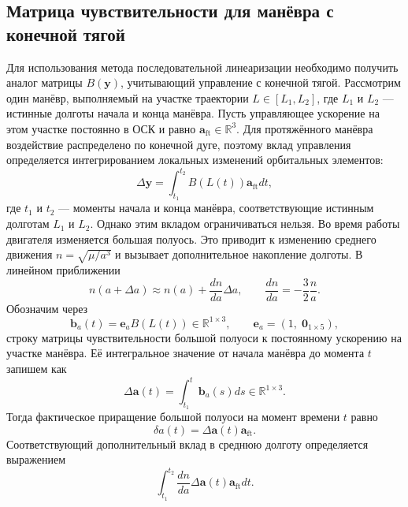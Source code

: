 \subsection{Матрица чувствительности для манёвра с конечной тягой}

Для использования метода последовательной линеаризации необходимо получить аналог матрицы $B(\mathbf{y})$, учитывающий управление с конечной тягой. Рассмотрим один манёвр, выполняемый на участке траектории $L \in [L_1, L_2]$, где $L_1$ и $L_2$ --- истинные долготы начала и конца манёвра. Пусть управляющее ускорение на этом участке постоянно в ОСК и равно $\mathbf{a}_{\text{ft}} \in \mathbb{R}^{3}$. Для протяжённого манёвра воздействие распределено по конечной дуге, поэтому вклад управления определяется интегрированием локальных изменений орбитальных элементов:
\begin{equation}
    \Delta \mathbf{y} = \int_{t_1}^{t_2} B(L(t)) \mathbf{a}_{\text{ft}} dt,
\end{equation}
где $t_1$ и $t_2$ --- моменты начала и конца манёвра, соответствующие истинным долготам $L_1$ и $L_2$.
Однако этим вкладом ограничиваться нельзя. Во время работы двигателя изменяется большая полуось. Это приводит к изменению среднего движения $n = \sqrt{\mu / a^3}$ и вызывает дополнительное накопление долготы. В линейном приближении
\begin{equation}
    n(a + \Delta a) \approx n(a) + \frac{dn}{da} \Delta a, \quad \quad 
    \frac{dn}{da} = -\frac{3}{2} \frac{n}{a}.
\end{equation}
Обозначим через
\begin{equation}
    \mathbf{b}_a(t) = \mathbf{e}_a B(L(t)) \in \mathbb{R}^{1 \times 3}, \quad \quad
    \mathbf{e}_a = \left( 1, \; \mathbf{0}_{1 \times 5} \right),
\end{equation}
строку матрицы чувствительности большой полуоси к постоянному ускорению на участке манёвра. Её интегральное значение от начала манёвра до момента $t$ запишем как
\begin{equation}
    \Delta \mathbf{a}(t) = \int_{t_1}^t \mathbf{b}_a(s) ds \in \mathbb{R}^{1 \times 3}.
\label{da_b_a}
\end{equation}
Тогда фактическое приращение большой полуоси на момент времени $t$ равно
\begin{equation}
    \delta a(t) = \Delta \mathbf{a}(t) \mathbf{a}_{\text{ft}}.
\end{equation}
Соответствующий дополнительный вклад в среднюю долготу определяется выражением
\begin{equation}
    \int_{t_1}^{t_2} \frac{dn}{da} \Delta \mathbf{a}(t) \mathbf{a}_{\text{ft}} dt.
\end{equation}
